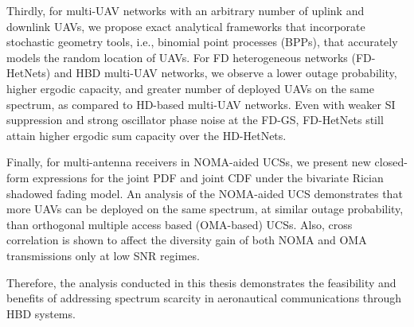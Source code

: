 Thirdly, for multi-UAV networks with an arbitrary number of uplink and downlink UAVs, we propose exact analytical frameworks that incorporate stochastic geometry tools, i.e., binomial point processes (BPPs), that accurately models the random location of UAVs. For FD heterogeneous networks (FD-HetNets) and HBD multi-UAV networks, we observe a lower outage probability, higher ergodic capacity, and greater number of deployed UAVs on the same spectrum, as compared to HD-based multi-UAV networks. Even with weaker SI suppression and strong oscillator phase noise at the FD-GS, FD-HetNets still attain higher ergodic sum capacity over the HD-HetNets. 

Finally, for multi-antenna receivers in NOMA-aided UCSs, we present new closed-form expressions for the joint PDF and joint CDF under the bivariate Rician shadowed fading model. An analysis of the NOMA-aided UCS demonstrates that more UAVs can be deployed on the same spectrum, at similar outage probability, than orthogonal multiple access based (OMA-based) UCSs. Also, cross correlation is shown to affect the diversity gain of both NOMA and OMA transmissions only at low SNR regimes.

Therefore, the analysis conducted in this thesis demonstrates the feasibility and benefits of addressing spectrum scarcity in aeronautical communications through HBD systems.


